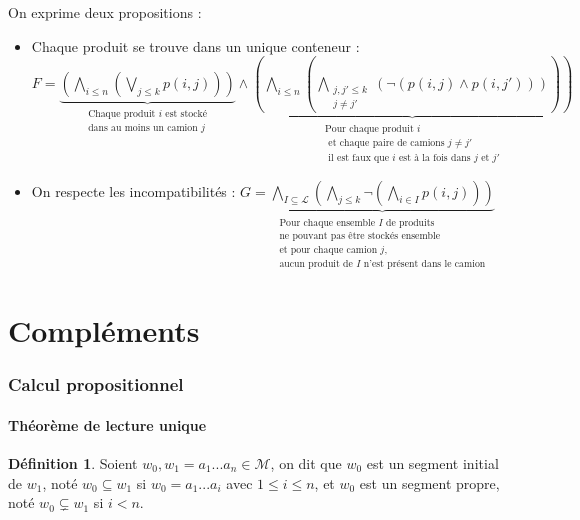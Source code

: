 \documentclass[]{article}
\theoremstyle{remark}
\theoremstyle{definition}
\newtheorem{mydef}{Définition}
\begin{document}
On exprime deux propositions :
\begin{itemize}
	\item Chaque produit se trouve dans un unique conteneur :
	$F = \underbrace{\left(\bigwedge\limits_{i \leqslant n} \left(\bigvee\limits_{j \leqslant k} p(i, j)\right) \right)}_{\substack{\text{Chaque produit } i \text{ est stocké} \\ \text{dans au moins un camion } j}} \land
	\underbrace{\left(\bigwedge\limits_{i \leqslant n} \left(\bigwedge\limits_{\substack{j, j' \leqslant k \\ j \neq j'}}(\neg\left(p(i, j) \land p(i, j')\right))\right)\right)}_{\substack{\text{Pour chaque produit } i \\ \text{ et chaque paire de camions } j \neq j' \\ \text{ il est faux que  } i \text{ est à la fois dans } j \text{ et } j'}}$
	
	\item On respecte les incompatibilités : $G = \underbrace{\bigwedge\limits_{I \subseteq \mathcal{L}} \left( \bigwedge\limits_{j \leqslant k}\neg \left( \bigwedge\limits_{i \in I}p(i, j)\right)\right)}_{\substack{\text{Pour chaque ensemble } I \text{ de produits } \\ \text{ne pouvant pas être stockés ensemble} \\ \text{et pour chaque camion } j , \\ \text{aucun produit de } I \text{ n'est présent dans le camion}}}$
\end{itemize}

\part{Compléments}

\section{Calcul propositionnel}

\subsection{Théorème de lecture unique}

\begin{mydef}
	Soient $w_0, w_1=a_1...a_n \in \mathcal{M}$, on dit que $w_0$ est un segment initial de $w_1$, noté $w_0 \subseteq w_1$ si $w_0=a_1...a_i$ avec $1 \leqslant i \leqslant n$, et $w_0$ est un segment propre, noté $w_0 \subsetneq w_1$ si $i < n$.
\end{mydef}
\end{document}
